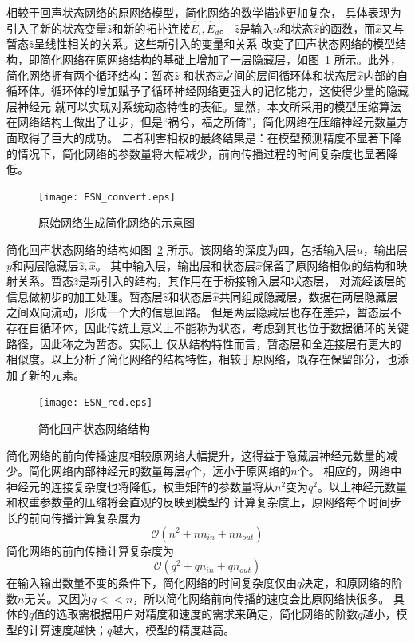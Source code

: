 相较于回声状态网络的原网络模型，简化网络的数学描述更加复杂， 具体表现为引入了新的状态变量\(\widehat{z}\)和新的拓扑连接\(\widehat{E}_l,\widehat{E}_d\)。
\(\widehat{z}\)是输入\(u\)和状态\(\widehat{x}\)的函数，而\(\widehat{x}\)又与暂态\(\widehat{z}\)呈线性相关的关系。这些新引入的变量和关系
改变了回声状态网络的模型结构，即简化网络在原网络结构的基础上增加了一层隐藏层，如图~\ref{fig:esn_convert} 所示。此外，简化网络拥有两个循环结构：暂态\(\widehat{z}\)
和状态\(\widehat{x}\)之间的层间循环体和状态层\(\widehat{x}\)内部的自循环体。循环体的增加赋予了循环神经网络更强大的记忆能力，这使得少量的隐藏层神经元
就可以实现对系统动态特性的表征。显然，本文所采用的模型压缩算法在网络结构上做出了让步，但是“祸兮，福之所倚”，简化网络在压缩神经元数量方面取得了巨大的成功。
二者利害相权的最终结果是：在模型预测精度不显著下降的情况下，简化网络的参数量将大幅减少，前向传播过程的时间复杂度也显著降低。
\begin{figure}
	\centering
	\texttt{[image: ESN\_convert.eps]}
	\caption{原始网络生成简化网络的示意图}
	\label{fig:esn_convert}
\end{figure}

简化回声状态网络的结构如图~\ref{fig:esn_red} 所示。该网络的深度为四，包括输入层\(u\)，输出层\(y\)和两层隐藏层\(\widehat{z},\widehat{x}\)。
其中输入层，输出层和状态层\(\widehat{x}\)保留了原网络相似的结构和映射关系。暂态\(\widehat{z}\)是新引入的结构，其作用在于桥接输入层和状态层，
对流经该层的信息做初步的加工处理。暂态层\(\widehat{z}\)和状态层\(\widehat{x}\)共同组成隐藏层，数据在两层隐藏层之间双向流动，形成一个大的信息回路。
但是两层隐藏层也存在差异，暂态层不存在自循环体，因此传统上意义上不能称为状态，考虑到其也位于数据循环的关键路径，因此称之为暂态。实际上
仅从结构特性而言，暂态层和全连接层有更大的相似度。以上分析了简化网络的结构特性，相较于原网络，既存在保留部分，也添加了新的元素。 

\begin{figure}
	\centering
	\texttt{[image: ESN\_red.eps]}
	\caption{简化回声状态网络结构}
	\label{fig:esn_red}
\end{figure}

简化网络的前向传播速度相较原网络大幅提升，这得益于隐藏层神经元数量的减少。简化网络内部神经元的数量每层\(q\)个，远小于原网络的\(n\)个。
相应的，网络中神经元的连接复杂度也将降低，权重矩阵的参数量将从\(n^2\)变为\(q^2\)。以上神经元数量和权重参数量的压缩将会直观的反映到模型的
计算复杂度上，原网络每个时间步长的前向传播计算复杂度为
\begin{equation}
	\mathcal{O}(n^2 + n n_{in} + n n_{out})
\end{equation}
简化网络的前向传播计算复杂度为
\begin{equation}
	\mathcal{O}(q^2 + q n_{in} + q n_{out})
	\label{eq:computeComplexity}
\end{equation}
在输入输出数量不变的条件下，简化网络的时间复杂度仅由\(q\)决定，和原网络的阶数\(n\)无关。又因为\(q<<n\)，所以简化网络前向传播的速度会比原网络快很多。
具体的\(q\)值的选取需根据用户对精度和速度的需求来确定，简化网络的阶数\(q\)越小，模型的计算速度越快；\(q\)越大，模型的精度越高。

